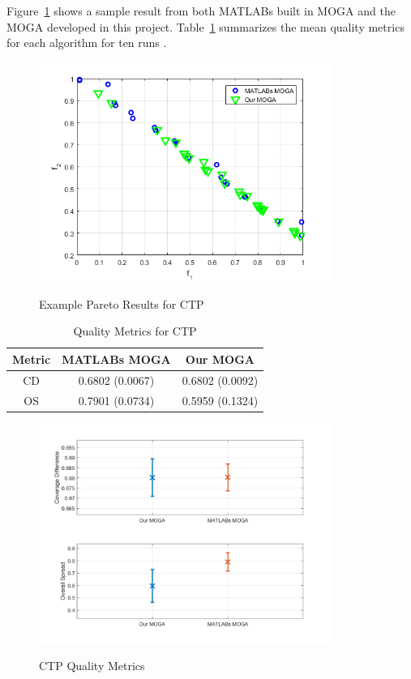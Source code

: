 \documentclass{article}
\begin{document}
\noindent Figure~\ref{fig:CTP} shows a sample result from both MATLABs built in MOGA and the MOGA developed in this project. Table~\ref{tab:CTP} summarizes the mean quality metrics for each algorithm for ten runs \cite{deb2001multi}.
\begin{figure}[h]
  \caption{Example Pareto Results for CTP}
  \centering
  \includegraphics[width=0.85\textwidth]{CTP_pareto_final.png}  
  \label{fig:CTP}
\end{figure}

\begin{table}[H]
\caption{Quality Metrics for CTP} 
\centering 
\begin{tabular}{|c|c|c|} 
\hline\hline  
Metric & MATLABs MOGA & Our MOGA \\ \hline
CD & 0.6802 (0.0067) &  0.6802 (0.0092) \\ \hline
OS & 0.7901 (0.0734) & 0.5959 (0.1324) \\ \hline
\end{tabular}
\label{tab:CTP} 
\end{table} 
\begin{figure}[H]
  \caption{CTP Quality Metrics}
  \centering
  \includegraphics[width=0.85\textwidth]{CTP_QM.png}  
  \label{fig:CTP_QM}
\end{figure}
 
\end{document}
